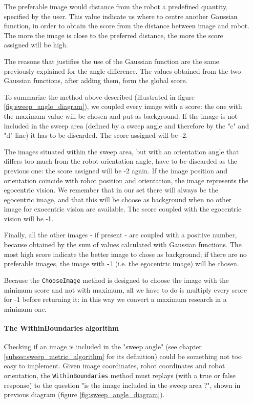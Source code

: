 %
The preferable image would distance from the robot a predefined quantity, specified by the user. This value
indicate us where to centre another Gaussian function, in order to obtain the score from the distance between
image and robot. The more the image is close to the preferred distance, the more the score assigned will be high.
%

%
The reasons that justifies the use of the Gaussian function are the same previously explained for the angle
difference. The values obtained from the two Gaussian functions, after adding them, form the global score.
%

%
To summarize the method above described (illustrated in figure \ref{fig:sweep_angle_diagram}), we coupled
every image with a score: the one with the maximum value will be chosen and put as background. If the image is
not included in the sweep area (defined by a sweep angle and therefore by the "c" and "d" line) it has to be
discarded. The score assigned will be -2.
%

%
The images situated within the sweep area, but with an orientation angle that differs too much from the robot
orientation angle, have to be discarded as the previous one: the score assigned will be -2 again.
If the image position and orientation coincide with robot position and orientation, the image represents the
egocentric vision. We remember that in our set there will always be the egocentric image, and that this will be
choose as background when no other image for exocentric vision are available. The score coupled with the egocentric 
vision will be -1.
%

%
Finally, all the other images - if present - are coupled with a positive number, because obtained by the sum of
values calculated with Gaussian functions. The most high score indicate the better image to chose as background;
if there are no preferable images, the image with -1 (i.e. the egocentric image) will be chosen.
%

%
Because the \texttt{ChooseImage} method is designed to choose the image with the minimum score and not with maximum,
all we have to do is multiply every score for -1 before returning it: in this way we convert a maximum research in
a minimum one.
%

%
\paragraph{The WithinBoundaries algorithm}
\label{par:withinboundaries}

Checking if an image is included in the "sweep angle" (see chapter \ref{subsec:sweep_metric_algorithm} for its
definition) could be something not too easy to implement. Given image coordinates, robot coordinates and robot
orientation, the \texttt{WithinBoundaries} method must replays (with a true or false response) to the question
"is the image included in the sweep area ?", shown in previous diagram (figure \ref{fig:sweep_angle_diagram}).
%


